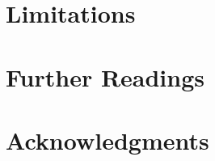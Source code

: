 \documentclass{article}
\begin{document}
\section{Limitations}\label{sec:limitations}


\section{Further Readings}\label{sec:ads}


\section*{Acknowledgments}



{}
\bgroup
\small

\egroup
\end{document}
